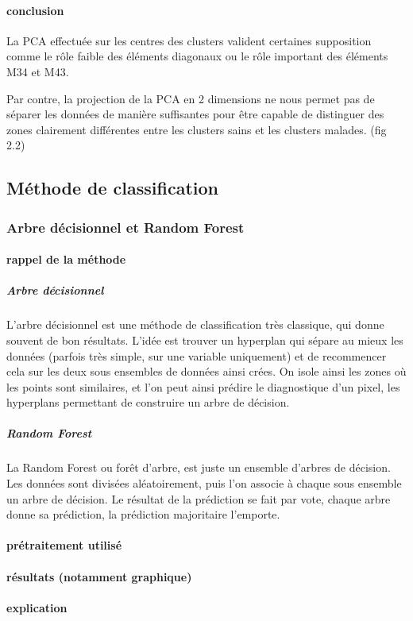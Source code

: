 \documentclass[a4paper,10pt]{report}
\begin{document}
\paragraph{conclusion}
La PCA effectuée sur les centres des clusters valident certaines supposition comme le rôle faible des éléments diagonaux ou le rôle important des éléments M34 et M43.

Par contre, la projection de la PCA en 2 dimensions ne nous permet pas de séparer les données de manière suffisantes pour être capable de distinguer des zones clairement différentes entre les clusters sains et les clusters malades. (fig 2.2)
\subsection{Méthode de classification}

\subsubsection{Arbre décisionnel et Random Forest}
\paragraph{rappel de la méthode }

\subparagraph{Arbre décisionnel} 
L'arbre décisionnel est une méthode de classification très classique, qui donne souvent de bon résultats. L'idée est trouver un hyperplan qui sépare au mieux les données (parfois très simple, sur une variable uniquement) et de recommencer cela sur les deux sous ensembles de données ainsi crées. On isole ainsi les zones où les points sont similaires, et l'on peut ainsi prédire le diagnostique d'un pixel, les hyperplans permettant de construire un arbre de décision.
\subparagraph{Random Forest}
La Random Forest ou forêt d'arbre, est juste un ensemble d'arbres de décision. Les données sont divisées aléatoirement, puis l'on associe à chaque sous ensemble un arbre de décision. Le résultat de la prédiction se fait par vote, chaque arbre donne sa prédiction, la prédiction majoritaire l'emporte.
\paragraph{prétraitement utilisé}
\paragraph{résultats (notamment graphique)}
\paragraph{explication}
\end{document}
